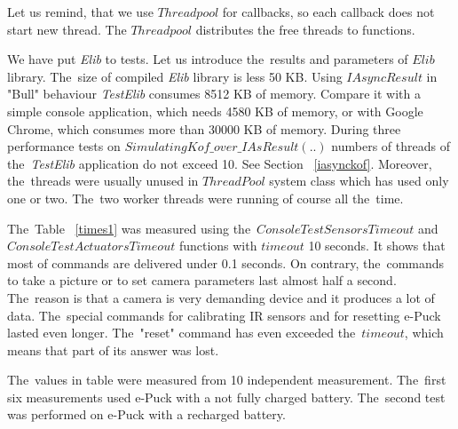   \begin{remark}
   Let us remind, that we use $Threadpool$ for callbacks, so each callback
   does not start new thread.
   The $Threadpool$ distributes the free threads to functions.
  \end{remark}
  We have put {\it Elib} to tests. Let us introduce 
  the~results and parameters of $Elib$ library.
  The~size of compiled {\it Elib} library is less 50 KB.
  Using $IAsyncResult$ in "Bull" behaviour  {\it TestElib} consumes 8512 KB of memory.
  Compare it with a simple console application, which needs 4580 KB of memory, or with Google Chrome, 
  which consumes more than 30000 KB of memory.
  During three performance tests on $SimulatingKof\_over\_IAsResult(..)$
  numbers of threads of the~{\it TestElib} application do not exceed 10. 
  See Section ~\ref{iasynckof}. Moreover, the~threads were usually unused
  in $ThreadPool$ system class which has used only one or two. 
  The~two worker threads were running of course all the~time.

  The~Table ~\ref{times1}  was measured using the~$ConsoleTestSensorsTimeout$ and
  $ConsoleTestActuatorsTimeout$ functions with $timeout$ 10 seconds.
  It shows that most of commands are delivered under 0.1 seconds. 
  On contrary, the~commands to take a picture or to set camera parameters 
   last almost half a second. 
  The~reason is that a camera is very demanding device and it produces a lot of data.
  The~special commands for calibrating IR sensors and for resetting e-Puck lasted even longer.
  The~"reset" command has even exceeded the~$timeout$,
  which means that part of its answer was lost.

  The~values in table were measured from 10 independent measurement. 
  The~first six measurements used e-Puck with a not fully charged battery.
  The~second test was performed on e-Puck with a recharged battery.


